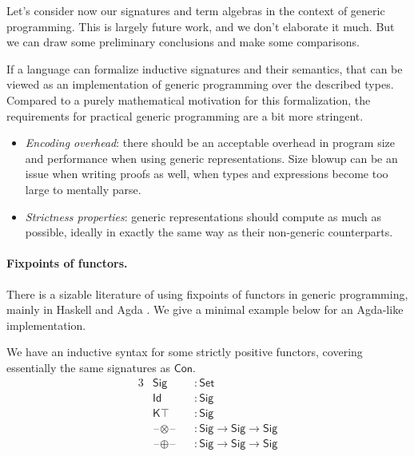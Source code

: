 \documentclass[12pt,a4paper,twoside,openany]{book}
\theoremstyle{remark}
\theoremstyle{definition}
\theoremstyle{theorem}
\newcommand{\ms}[1]{\mathsf{#1}}
\newcommand{\Con}{\mathsf{Con}}
\newcommand{\blank}{\mathord{\hspace{1pt}\text{--}\hspace{1pt}}}
\newcommand{\Set}{\mathsf{Set}}
\begin{document}
Let's consider now our signatures and term algebras in the context of generic
programming. This is largely future work, and we don't elaborate it much. But we
can draw some preliminary conclusions and make some comparisons.

If a language can formalize inductive signatures and their semantics, that can
be viewed as an implementation of generic programming over the described types.
Compared to a purely mathematical motivation for this formalization, the
requirements for practical generic programming are a bit more stringent.
\begin{itemize}
  \item \emph{Encoding overhead}: there should be an acceptable overhead in
    program size and performance when using generic representations.  Size
    blowup can be an issue when writing proofs as well, when types and
    expressions become too large to mentally parse.
  \item \emph{Strictness properties}: generic representations should compute as
    much as possible, ideally in exactly the same way as their non-generic
    counterparts.
\end{itemize}

\paragraph{Fixpoints of functors.}There is a sizable literature
of using fixpoints of functors in generic programming, mainly in Haskell
\cite{alacarte,compdata,multirec} and Agda \cite{loh11generic,allais20type}. We
give a minimal example below for an Agda-like implementation.

We have an inductive syntax for some strictly positive functors, covering essentially the
same signatures as $\Con$.
\begin{alignat*}{3}
  & \ms{Sig}                &&: \Set \\
  & \ms{Id}                 &&: \ms{Sig} \\
  & \ms{K\top}              &&: \ms{Sig} \\
  & \blank\!\otimes\!\blank &&: \ms{Sig} \to \ms{Sig} \to \ms{Sig} \\
  & \blank\!\oplus\!\blank  &&: \ms{Sig} \to \ms{Sig} \to \ms{Sig}
\end{alignat*}
\end{document}
